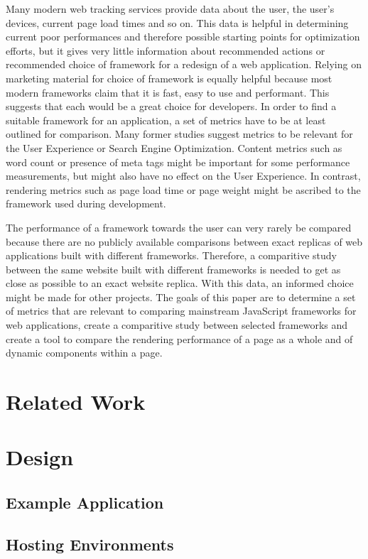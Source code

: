 \documentclass[a4paper, fontsize=11pt]{article}
\begin{document}
Many modern web tracking services provide data about the user, the user's devices, current page load times and so on.
This data is helpful in determining current poor performances and therefore possible starting points for optimization efforts, but it gives very little information about recommended actions or recommended choice of framework for a redesign of a web application.
Relying on marketing material for choice of framework is equally helpful because most modern frameworks claim that it is fast, easy to use and performant.
This suggests that each would be a great choice for developers.
In order to find a suitable framework for an application, a set of metrics have to be at least outlined for comparison.
Many former studies suggest metrics to be relevant for the User Experience or Search Engine Optimization.
Content metrics such as word count or presence of meta tags might be important for some performance measurements, but might also have no effect on the User Experience.
In contrast, rendering metrics such as page load time or page weight might be ascribed to the framework used during development.

The performance of a framework towards the user can very rarely be compared because there are no publicly available comparisons between exact replicas of web applications built with different frameworks.
Therefore, a comparitive study between the same website built with different frameworks is needed to get as close as possible to an exact website replica.
With this data, an informed choice might be made for other projects.
The goals of this paper are to determine a set of metrics that are relevant to comparing mainstream JavaScript frameworks for web applications, create a comparitive study between selected frameworks and create a tool to compare the rendering performance of a page as a whole and of dynamic components within a page.

\section{Related Work}\label{sec:relatedwork}
\section{Design}\label{sec:design}
\subsection{Example Application}\label{subsec:exampleapplication}
\subsection{Hosting Environments}\label{subsec:hostingenvironments}
\end{document}
